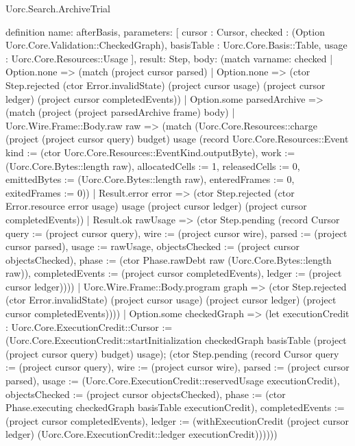 \begin{lexlean}{Uorc.Search.ArchiveTrial}
\begin{semanticmodule}
definition{
  name: afterBasis,
  parameters: [
    cursor : Cursor,
    checked : (Option Uorc.Core.Validation::CheckedGraph),
    basisTable : Uorc.Core.Basis::Table,
    usage : Uorc.Core.Resources::Usage
  ],
  result: Step,
  body: (match var{name: checked}
    | Option.none => (match (project cursor parsed)
      | Option.none => (ctor Step.rejected (ctor Error.invalidState) (project cursor usage) (project cursor ledger) (project cursor completedEvents))
      | Option.some parsedArchive => (match (project (project parsedArchive frame) body)
        | Uorc.Wire.Frame::Body.raw raw => (match (Uorc.Core.Resources::charge (project (project cursor query) budget) usage (record Uorc.Core.Resources::Event {kind := (ctor Uorc.Core.Resources::EventKind.outputByte), work := (Uorc.Core.Bytes::length raw), allocatedCells := 1, releasedCells := 0, emittedBytes := (Uorc.Core.Bytes::length raw), enteredFrames := 0, exitedFrames := 0}))
          | Result.error error => (ctor Step.rejected (ctor Error.resource error usage) usage (project cursor ledger) (project cursor completedEvents))
          | Result.ok rawUsage => (ctor Step.pending (record Cursor {query := (project cursor query), wire := (project cursor wire), parsed := (project cursor parsed), usage := rawUsage, objectsChecked := (project cursor objectsChecked), phase := (ctor Phase.rawDebt raw (Uorc.Core.Bytes::length raw)), completedEvents := (project cursor completedEvents), ledger := (project cursor ledger)})))
        | Uorc.Wire.Frame::Body.program graph => (ctor Step.rejected (ctor Error.invalidState) (project cursor usage) (project cursor ledger) (project cursor completedEvents))))
    | Option.some checkedGraph => (let executionCredit : Uorc.Core.ExecutionCredit::Cursor := (Uorc.Core.ExecutionCredit::startInitialization checkedGraph basisTable (project (project cursor query) budget) usage); (ctor Step.pending (record Cursor {query := (project cursor query), wire := (project cursor wire), parsed := (project cursor parsed), usage := (Uorc.Core.ExecutionCredit::reservedUsage executionCredit), objectsChecked := (project cursor objectsChecked), phase := (ctor Phase.executing checkedGraph basisTable executionCredit), completedEvents := (project cursor completedEvents), ledger := (withExecutionCredit (project cursor ledger) (Uorc.Core.ExecutionCredit::ledger executionCredit))}))))
}


\end{semanticmodule}
\end{lexlean}

